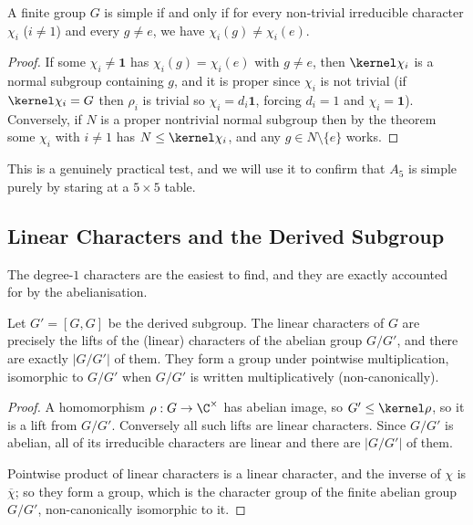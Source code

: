 \begin{corollary}
	A finite group $G$ is simple if and only if for every non-trivial irreducible character $\chi_i$ ($i \neq 1$) and every $g \neq e$, we have $\chi_i(g) \neq \chi_i(e)$.
\end{corollary}
\begin{proof}
	If some $\chi_i \neq \mathbf 1$ has $\chi_i(g) = \chi_i(e)$ with $g \neq e$, then $\kernel\chi_i$ is a normal subgroup containing $g$, and it is proper since $\chi_i$ is not trivial (if $\kernel\chi_i = G$ then $\rho_i$ is trivial so $\chi_i = d_i\mathbf 1$, forcing $d_i=1$ and $\chi_i = \mathbf 1$). Conversely, if $N$ is a proper nontrivial normal subgroup then by the theorem some $\chi_i$ with $i \neq 1$ has $N \leq \kernel \chi_i$, and any $g \in N\setminus\{e\}$ works.
\end{proof}

This is a genuinely practical test, and we will use it to confirm that $A_5$ is simple purely by staring at a $5\times5$ table.

\subsection{Linear Characters and the Derived Subgroup}

The degree-$1$ characters are the easiest to find, and they are exactly accounted for by the abelianisation.

\begin{proposition}
	Let $G' = [G,G]$ be the derived subgroup. The linear characters of $G$ are precisely the lifts of the (linear) characters of the abelian group $G/G'$, and there are exactly $|G/G'|$ of them. They form a group under pointwise multiplication, isomorphic to $G/G'$ when $G/G'$ is written multiplicatively (non-canonically).
\end{proposition}
\begin{proof}
	A homomorphism $\rho : G \to \C^\times$ has abelian image, so $G' \leq \kernel\rho$, so it is a lift from $G/G'$. Conversely all such lifts are linear characters. Since $G/G'$ is abelian, all of its irreducible characters are linear and there are $|G/G'|$ of them.

	Pointwise product of linear characters is a linear character, and the inverse of $\chi$ is $\overline\chi$; so they form a group, which is the character group of the finite abelian group $G/G'$, non-canonically isomorphic to it.
\end{proof}

